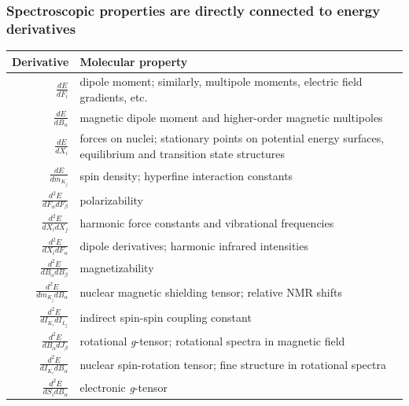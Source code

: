 \documentclass{beamer}
\begin{document}
\begin{frame}
  \frametitle{Spectroscopic properties are directly connected to energy derivatives}
  \centering
  \scriptsize
  \begin{tabulary}{1.00\textwidth}{rL}
    \toprule
    \textbf{Derivative} & \textbf{Molecular property} \\
    \midrule
    \(\frac{dE}{dF_{i}}\)                          & dipole moment; similarly,  multipole moments, electric field gradients, etc. \\
    \(\frac{dE}{dB_{\alpha}}\)                     & magnetic dipole moment and higher-order magnetic multipoles \\
    \(\frac{dE}{dX_{i}}\)                          & forces on nuclei; stationary points on potential energy surfaces, equilibrium and transition state structures \\
    \(\frac{dE}{dm_{K_{j}}}\)                      & spin density; hyperfine interaction constants \\
    \(\frac{d^{2}E}{dF_{\alpha}dF_{\beta}}\)       & polarizability \\
    \(\frac{d^{2}E}{dX_{i}dX_{j}}\)                & harmonic force constants and vibrational frequencies \\
    \(\frac{d^{2}E}{dX_{i}dF_{\alpha}}\)           & dipole derivatives; harmonic infrared intensities \\
    \(\frac{d^{2}E}{dB_{\alpha}dB_{\beta}}\)       & magnetizability \\
    \(\frac{d^{2}E}{dm_{K_{j}}dB_{\alpha}}\)       & nuclear magnetic shielding tensor; relative NMR shifts \\
    \(\frac{d^{2}E}{dI_{K_{i}}dI_{L_{j}}}\)        & indirect spin-spin coupling constant \\
    \(\frac{d^{2}E}{dB_{\alpha}dJ_{\beta}}\)       & rotational \textit{g}-tensor; rotational spectra in magnetic field \\
    \(\frac{d^{2}E}{dI_{K_{i}}dB_{\alpha}}\)       & nuclear spin-rotation tensor; fine structure in rotational spectra \\
    \(\frac{d^{2}E}{dS_{i}dB_{\alpha}}\)           & electronic \textit{g}-tensor \\

\end{tabulary}
\end{frame}
\end{document}
